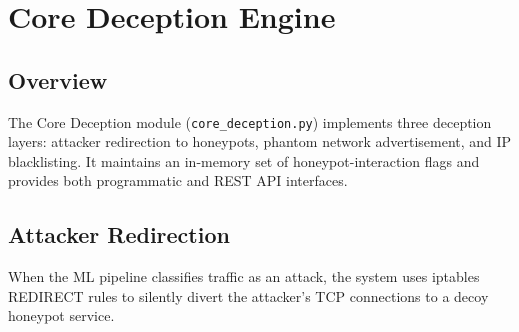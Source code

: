 \documentclass[12pt,a4paper]{article}
\begin{document}
\section{Core Deception Engine}
\label{sec:deception}

\subsection{Overview}

The Core Deception module (\texttt{core\_deception.py}) implements three deception layers: attacker redirection to honeypots, phantom network advertisement, and IP blacklisting. It maintains an in-memory set of honeypot-interaction flags and provides both programmatic and REST API interfaces.

\subsection{Attacker Redirection}

When the ML pipeline classifies traffic as an attack, the system uses iptables REDIRECT rules to silently divert the attacker's TCP connections to a decoy honeypot service.
\end{document}
